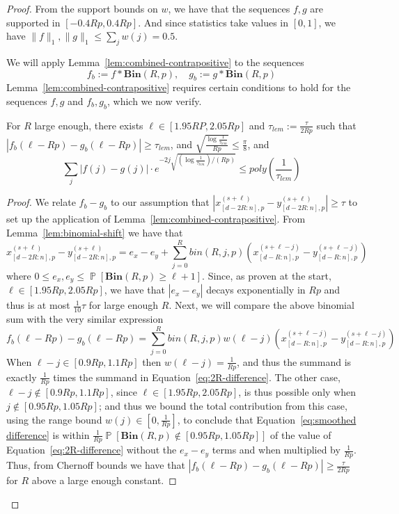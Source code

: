 \documentclass[10pt,a4paper]{amsart}
\newcommand{\Bin}[2]{\textbf{Bin}(#1,#2)}
\newcommand{\abs}[1]{\left|#1\right|}
\renewcommand{\Pr}{\operatorname*{\mathbb{P}}}
\begin{document}
\begin{proof}
From the support bounds on $w$, we have that the sequences $f,g$ are supported in $[-0.4Rp,0.4Rp]$. And since statistics take values in $[0,1]$, we have $\|f\|_1,\|g\|_1\leq \sum_j w(j) =0.5$. 

We will apply Lemma~\ref{lem:combined-contrapositive} to the sequences
\begin{equation*}
    f_b := f \ast \Bin{R}{p}, \quad g_b := g \ast \Bin{R}{p}
\end{equation*}
Lemma~\ref{lem:combined-contrapositive} requires certain conditions to hold for the sequences $f,g$ and $f_b,g_b$, which we now verify.

\begin{lemma}
    \label{lem:contrapositive-conditions}
    For $R$ large enough, there exists $\ell \in [1.95RP,2.05Rp]$ and $\tau_{lem} := \frac{\tau}{2Rp}$ such that $\abs{f_b(\ell-Rp) - g_b(\ell-Rp)} \geq \tau_{lem}$, and $\sqrt{\frac{\log \frac{1}{\tau_{lem}}}{Rp}} \leq \frac{\pi}{8}$, and \begin{equation}
        \label{eq:left-tail}
        \sum_j |f(j)-g(j)|\cdot e^{-2j\sqrt{(\log\frac{1}{\tau_{lem}})/(Rp)}}\leq poly\left(\frac{1}{\tau_{lem}}\right)
    \end{equation}
\end{lemma}
\begin{proof}
    We relate $f_b-g_b$ to our assumption that $|x_{[d-2R:n],p}^{(s+\ell)}-y_{[d-2R:n],p}^{(s+\ell)}|\geq \tau$ to set up the application of Lemma~\ref{lem:combined-contrapositive}. From Lemma~\ref{lem:binomial-shift} we have that 
    \begin{equation}
        \label{eq:2R-difference}
        x_{[d-2R:n],p}^{(s+\ell)}-y_{[d-2R:n],p}^{(s+\ell)}=e_x-e_y+\sum_{j=0}^R bin(R,j,p)\left(x_{[d-R:n],p}^{(s+\ell-j)}-y_{[d-R:n],p}^{(s+\ell-j)}\right)
    \end{equation}
    where  $0\leq e_x,e_y\leq \Pr[\Bin{R}{p}\geq \ell+1]$. Since, as proven at the start, $\ell\in [1.95Rp,2.05Rp]$, we have that $|e_x-e_y|$ decays exponentially in $Rp$ and thus is at most $\frac{1}{10}\tau$ for large enough $R$. Next, we will compare the above binomial sum with the very similar expression
    \begin{equation}
        \label{eq:smoothed difference}
        f_b(\ell-Rp)-g_b(\ell-Rp)=\sum_{j=0}^R bin(R,j,p) w(\ell-j) \left(x^{(s+\ell-j)}_{[d-R:n],p}-y^{(s+\ell-j)}_{[d-R:n],p}\right)
    \end{equation}
    When $\ell-j\in[0.9Rp,1.1Rp]$ then $w(\ell-j)=\frac{1}{Rp}$, and thus the summand is exactly $\frac{1}{Rp}$ times the summand in Equation~\ref{eq:2R-difference}. The other case, $\ell-j\notin[0.9Rp,1.1Rp]$, since $\ell\in [1.95Rp,2.05Rp]$, is thus possible only when $j\notin [0.95Rp,1.05Rp]$; and thus we bound the total contribution from this case, using the range bound $w(j)\in [0,\frac{1}{Rp}]$, to conclude that Equation~\ref{eq:smoothed difference} is within $\frac{1}{Rp}\Pr[\Bin{R}{p}\notin [0.95Rp,1.05Rp]]$ of the value of Equation~\ref{eq:2R-difference} without the $e_x-e_y$ terms and when multiplied by $\frac{1}{Rp}$. Thus, from Chernoff bounds we have that $|f_b(\ell-Rp)-g_b(\ell-Rp)|\geq \frac{\tau}{2Rp}$ for $R$ above a large enough constant. 


\end{proof}
\end{proof}
\end{document}
